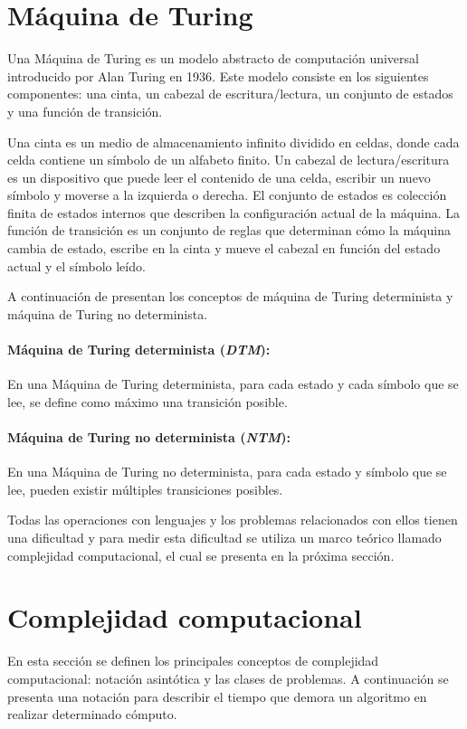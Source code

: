 \section{Máquina de Turing}

Una Máquina de Turing \cite{authomataTheory} es un modelo abstracto de computación universal introducido por 
Alan Turing en 1936. Este modelo consiste en los siguientes componentes: una cinta, un cabezal de escritura/lectura,
un conjunto de estados y una función de transición.

Una cinta es un medio de almacenamiento infinito dividido en celdas, donde cada celda contiene un símbolo de un alfabeto finito.
Un cabezal de lectura/escritura es un dispositivo que puede leer el contenido de una celda, escribir un nuevo símbolo y moverse a la izquierda o derecha.
El conjunto de estados es colección finita de estados internos que describen la configuración actual de la máquina.
La función de transición es un conjunto de reglas que determinan cómo la máquina cambia de estado, escribe en la cinta y mueve el cabezal en función del estado actual y el símbolo leído.

A continuación de presentan los conceptos de máquina de Turing determinista y máquina de Turing no determinista.

\paragraph{Máquina de Turing determinista (\textit{DTM}):}
En una Máquina de Turing determinista, para cada estado y cada símbolo que se lee, se define como
máximo una transición posible.
\paragraph{Máquina de Turing no determinista (\textit{NTM}):}
En una Máquina de Turing no determinista, para cada estado y símbolo que se lee, pueden existir múltiples transiciones posibles.

Todas las operaciones con lenguajes y los problemas relacionados con ellos tienen una dificultad y para medir esta dificultad
se utiliza un marco teórico llamado complejidad computacional, el cual se presenta en la próxima sección.

\section{Complejidad computacional}

En esta sección se definen los principales conceptos de complejidad computacional: notación asintótica
y las clases de problemas. A continuación se presenta una notación para describir el tiempo que demora un 
algoritmo en realizar determinado cómputo.

